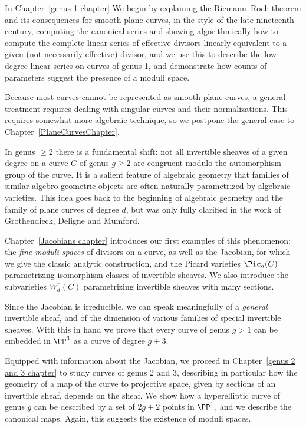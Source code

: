In Chapter~\ref{genus 1 chapter} We begin by explaining the
Riemann--Roch theorem and its consequences for smooth plane curves,  in
the style of the late 
nineteenth
century, computing the canonical series and showing algorithmically how to compute the complete linear series of effective divisors linearly equivalent to a given (not necessarily effective) divisor, and we use this 
to describe the low-degree linear series on curves of genus 1, and demonstrate how counts of parameters suggest the presence of a moduli space.

Because most curves cannot be represented as smooth plane curves, a general treatment requires dealing with
singular curves and their normalizations. This requires somewhat more algebraic technique, so we postpone the general case to Chapter~\ref{PlaneCurvesChapter}.  

In genus $\geq 2$ there is a fundamental shift: not all invertible sheaves of a given degree on a curve $C$ of genus $g \geq 2$ are congruent modulo the automorphism group of the curve.
It is a salient feature of algebraic geometry that families of similar algebro-geometric objects are often naturally parametrized by algebraic varieties. This idea goes back to the beginning of algebraic geometry and the family of plane curves of degree $d$, but was only fully clarified in the work of Grothendieck, Deligne and Mumford.
%
%

Chapter~\ref{Jacobians chapter} introduces our first examples of this phenomenon: the \emph{fine moduli spaces} of divisors on a curve, as well as the Jacobian, for which we give the classic analytic construction, and the Picard varieties $\Pic_d(C)$ parametrizing isomorphism classes of invertible sheaves. We also introduce the subvarieties $W^{r}_{d}(C)$ parametrizing invertible sheaves with many sections. 

 Since the Jacobian is irreducible, we can speak meaningfully of a \emph{general} invertible sheaf, and of the dimension of various families of special invertible sheaves. With this in hand we prove
that every curve of genus $g>1$ can be embedded in $\PP^{3}$ as a curve of degree $g+3$.

Equipped with information about the Jacobian, we proceed in Chapter~\ref{genus 2 and 3 chapter} to study curves of genus 2 and 3, describing in particular how the geometry of a map of the curve to projective space,  given by sections of an invertible sheaf, depends on the sheaf. We show how a hyperelliptic curve of genus $g$
can be described by a set of $2g+2$ points in $\PP^{1}$, and we describe the canonical maps. Again, this
suggests the existence of moduli spaces.

